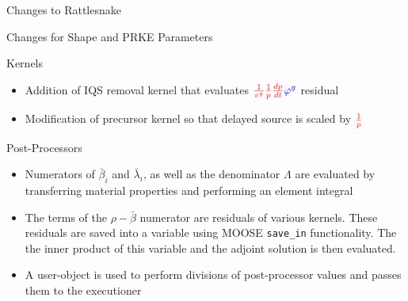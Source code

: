 \documentclass[8pt]{beamer}
\newcommand{\bi}{\begin{itemize}}
\newcommand{\ei}{\end{itemize}}
\newcommand{\tcr}[1]{\textcolor{red}{#1}}
\newcommand{\tcb}[1]{\textcolor{blue}{#1}}
\newcommand{\tcm}[1]{\textcolor{magenta}{#1}}
\begin{document}
\begin{frame}{Changes to Rattlesnake}

\end{frame}


\begin{frame}{Changes for Shape and PRKE Parameters}

\begin{block}{Kernels}
\bi
\item Addition of IQS removal kernel that evaluates $\tcr{\frac{1}{v^g}\frac{1}{p}\frac{dp}{dt}} \tcb{\varphi^g}$ residual
\item Modification of precursor kernel so that delayed source is scaled by $\tcr{\frac{1}{p}}$
\ei
\end{block}

\begin{block}{Post-Processors}
\bi
\item Numerators of $\bar{\beta}_i$ and $\bar{\lambda}_i$, as well as the denominator $\Lambda$ are evaluated by transferring material properties and performing an element integral
\item The terms of the $\rho-\bar{\beta}$ numerator are residuals of various kernels. These residuals are saved into a variable using MOOSE \texttt{save\_in} functionality.  The the inner product of this variable and the adjoint solution is then evaluated.
\item A user-object is used to perform divisions of post-processor values and passes them to the executioner
\ei

\end{block}

\end{frame}
\end{document}
